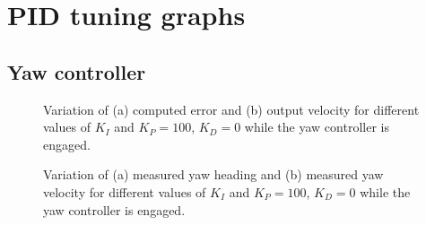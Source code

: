 \chapter{PID tuning graphs}

\section{Yaw controller}
\label{app:yaw-pid-results}

\begin{figure}[H]
    \begin{minipage}[t]{0.5\linewidth}
        \centering
        \scalebox{0.55}{}
    \end{minipage}
    \begin{minipage}[t]{0.5\linewidth}
        \centering
        \scalebox{0.55}{}
    \end{minipage}
    \caption{Variation of (a) computed error and (b) output velocity for different values of $K_{I}$ and $K_P=100$, $K_D=0$ while the yaw controller is engaged.}
    \label{fig:tune-yaw-int-io}
\end{figure}
\begin{figure}[H]
    \begin{minipage}[t]{0.5\linewidth}
        \centering
        \scalebox{0.55}{}
    \end{minipage}
    \begin{minipage}[t]{0.5\linewidth}
        \centering
        \scalebox{0.55}{}
    \end{minipage}
    \caption{Variation of (a) measured yaw heading and (b) measured yaw velocity for different values of $K_{I}$ and $K_P=100$, $K_D=0$ while the yaw controller is engaged.}
    \label{fig:tune-yaw-int-measures}
\end{figure}

